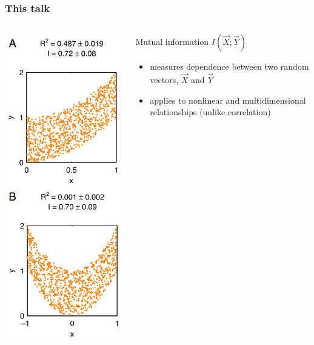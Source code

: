 \documentclass{beamer}
\begin{document}
\begin{frame}
\frametitle{This talk}
\begin{columns}
\begin{column}{0.25\textwidth}
\includegraphics[scale = 0.27]{kinney3.png}
\end{column}
\begin{column}{0.75\textwidth}
Mutual information $I(\vec{X}; \vec{Y})$
\begin{itemize}
\item measures dependence between two random vectors, $\vec{X}$ and $\vec{Y}$ \pause
\item applies to nonlinear and multidimensional relationships (unlike correlation) \pause

\end{itemize}
\end{column}
\end{columns}
\end{frame}
\end{document}
